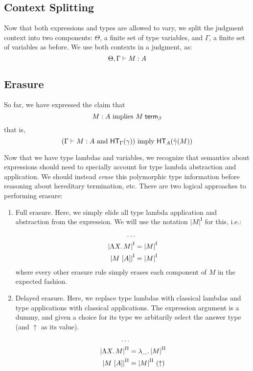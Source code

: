 \documentclass{article}
\begin{document}
\subsection{Context Splitting}

Now that both expressions and types are allowed to vary, we split the judgment context into two
components: $\Theta$, a finite set of type variables, and $\Gamma$, a finite set of variables as
before. We use both contexts in a judgment, as:
\[ \Theta, \Gamma \vdash M : A \]

\subsection{Erasure}

So far, we have expressed the claim that
\[ M : A~\text{implies}~{M} \; \mathsf{term}_{\beta} \]
that is,
\[(\Gamma \vdash M : A~\text{and}~\mathsf{HT}_{\Gamma}(\gamma))~\text{imply}~\mathsf{HT}_{A}(\hat\gamma(M)) \]

\newcommand{\eraseone}[1]{\ensuremath{{|#1|}^{\textrm{I}}}}
\newcommand{\erasetwo}[1]{\ensuremath{{|#1|}^{\textrm{II}}}}
Now that we have type lambdas and variables, we recognize that semantics about expressions should
need to specially account for type lambda abstraction and application. We should instead \emph{erase}
this polymorphic type information before reasoning about hereditary termination, etc. There are
two logical approaches to performing erasure:
\begin{enumerate}
    \item Full erasure. Here, we simply elide all type lambda application and abstraction from
    the expression. We will use the notation \eraseone{M} for this, i.e.:
    \begin{align*}
    \ldots &\\
    \eraseone{\tlam{X}{M}} &= \eraseone{M}\\
    \eraseone{\tap{M}{A}} &= \eraseone{M}
    \end{align*}
    where every other erasure rule simply erases each component of $M$ in the expected fashion.
    \item Delayed erasure. Here, we replace type lambdas with classical lambdas and type applications
    with classical applications. The expression argument is a dummy, and given a choice for its type
    we arbitarily select the answer type (and $\uparrow$ as its value).
    \begin{align*}
    \ldots &\\
    \erasetwo{\tlam{X}{M}} &= \alam{\erasetwo{M}}\\
    \erasetwo{\tap{M}{A}} &= \ap{\erasetwo{M}}{(\uparrow)}
    \end{align*}
\end{enumerate}
\end{document}
